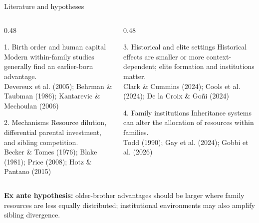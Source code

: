 \documentclass[aspectratio=169,10pt]{beamer}
\begin{document}
\begin{frame}{Literature and hypotheses}
\small
\begin{columns}[T,onlytextwidth]
\begin{column}{0.48\textwidth}
\begin{block}{1. Birth order and human capital}
Modern within-family studies generally find an earlier-born advantage.\\
{\scriptsize Devereux et al. (2005); Behrman \& Taubman (1986); Kantarevic \& Mechoulan (2006)}
\end{block}

\begin{block}{2. Mechanisms}
Resource dilution, differential parental investment, and sibling competition.\\
{\scriptsize Becker \& Tomes (1976); Blake (1981); Price (2008); Hotz \& Pantano (2015)}
\end{block}
\end{column}

\begin{column}{0.48\textwidth}
\begin{block}{3. Historical and elite settings}
Historical effects are smaller or more context-dependent; elite formation and institutions matter.\\
{\scriptsize Clark \& Cummins (2024); Cools et al. (2024); De la Croix \& Goñi (2024)}
\end{block}

\begin{block}{4. Family institutions}
Inheritance systems can alter the allocation of resources within families.\\
{\scriptsize Todd (1990); Gay et al. (2024); Gobbi et al. (2026)}
\end{block}
\end{column}
\end{columns}

\vspace{0.25em}
\textbf{Ex ante hypothesis:} older-brother advantages should be larger where family resources are less equally distributed; institutional environments may also amplify sibling divergence.
\end{frame}
\end{document}
